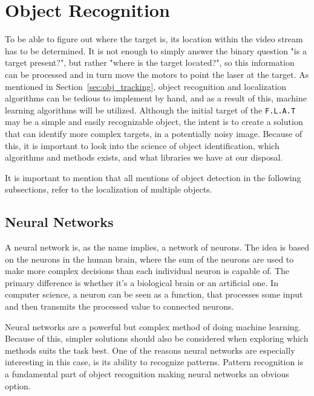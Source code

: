 \section{Object Recognition}
To be able to figure out where the target is, its location within the video stream has to be determined.
It is not enough to simply answer the binary question "is a target present?", but rather "where is the target located?", so this information can be processed and in turn move the motors to point the laser at the target.
As mentioned in Section~\ref{sec:obj_tracking}, object recognition and localization algorithms can be tedious to implement by hand, and as a result of this, machine learning algorithms will be utilized.
Although the initial target of the \texttt{F.L.A.T} may be a simple and easily recognizable object, the intent is to create a solution that can identify more complex targets, in a potentially noisy image.
Because of this, it is important to look into the science of object identification, which algorithms and methods exists, and what libraries we have at our disposal.

It is important to mention that all mentions of object detection in the following subsections, refer to the localization of multiple objects.

\subsection{Neural Networks}

A neural network is, as the name implies, a network of neurons.
The idea is based on the neurons in the human brain, where the sum of the neurons are used to make more complex decisions than each individual neuron is capable of.
The primary difference is whether it's a biological brain or an artificial one. 
In computer science, a neuron can be seen as a function, that processes some input and then transmits the processed value to connected neurons.

Neural networks are a powerful but complex method of doing machine learning.
Because of this, simpler solutions should also be considered when exploring which methods suits the task best.
One of the reasons neural networks are especially interesting in this case, is its ability to recognize patterns.
Pattern recognition is a fundamental part of object recognition making neural networks an obvious option.


